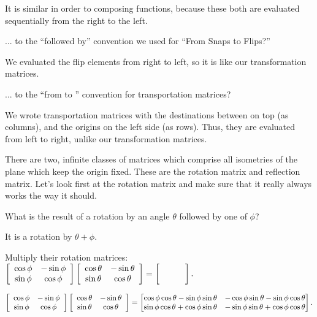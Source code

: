 \documentclass[../key.tex]{subfiles}
\begin{document}
It is similar in order to composing functions, because these both are evaluated sequentially from the right to the left.

\begin{iinner_problem}
\item ... to the ``followed by'' convention we used for ``From Snaps to Flips?''
\end{iinner_problem}

We evaluated the flip elements from right to left, so it is like our transformation matrices.

\begin{iinner_problem}
\item ... to the ``from \underline{\phantom{0}} to \underline{\phantom{0}}'' convention for transportation matrices?
\end{iinner_problem}

We wrote transportation matrices with the destinations between on top (as columns), and the origins on the left side (as rows). Thus, they are evaluated from left to right, unlike our transformation matrices.

\begin{outer_problem}
\item There are two, infinite classes of matrices which comprise all isometries of the plane which keep the origin fixed. These are the rotation matrix and reflection matrix. Let's look first at the rotation matrix and make sure that it really always works the way it should.
\end{outer_problem}

\begin{inner_problem}[start=1]
\item What is the result of a rotation by an angle $\theta$ followed by one of $\phi$?
\end{inner_problem}

It is a rotation by $\theta + \phi$.

\begin{inner_problem}
\item Multiply their rotation matrices: $\twomat{\cos \phi}{-\sin \phi}{\sin\phi}{\cos\phi} \twomat{\cos \theta}{-\sin \theta}{\sin\theta}{\cos\theta}=\blanktwomat.$
\end{inner_problem}

$$\left[\begin{array}{cc} \cos \phi & -\sin \phi \\ \sin\phi & \cos\phi \end{array}\right] \left[\begin{array}{cc} \cos \theta & -\sin \theta \\ \sin\theta & \cos\theta \end{array}\right] = \begin{bmatrix} \cos\phi\cos\theta - \sin\phi\sin\theta & -\cos\phi\sin\theta-\sin\phi\cos\theta \\ \sin\phi\cos\theta + \cos\phi\sin\theta & -\sin\phi\sin\theta+\cos\phi\cos\theta \end{bmatrix}.$$
\end{document}
